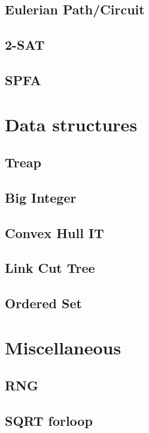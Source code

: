 \subsection{Eulerian Path/Circuit}
\raggedbottom
\hrulefill
\subsection{2-SAT}
\raggedbottom
\hrulefill
\subsection{SPFA}
\raggedbottom
\hrulefill

\section{Data structures}
\subsection{Treap}
\raggedbottom
\hrulefill
\subsection{Big Integer}
\raggedbottom
\hrulefill
\subsection{Convex Hull IT}
\raggedbottom
\hrulefill
\subsection{Link Cut Tree}
\raggedbottom
\hrulefill
\subsection{Ordered Set}
\raggedbottom
\hrulefill

\section{Miscellaneous}
\subsection{RNG}
\raggedbottom
\hrulefill
\subsection{SQRT forloop}
\raggedbottom
\hrulefill

